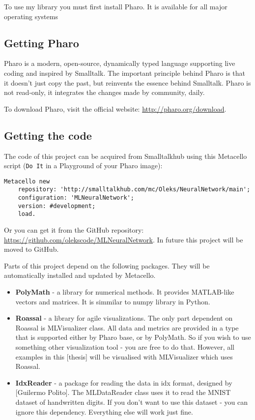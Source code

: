To use my library you must first install Pharo. It is available for all major operating systems

\subsection{Getting Pharo}
Pharo is a modern, open-source, dynamically typed language supporting live coding and inspired by Smalltalk. The important principle behind Pharo is that it doesn’t just copy the past, but reinvents the essence behind Smalltalk. Pharo is not read-only, it integrates the changes made by community, daily\cite{PBE2}.

To download Pharo, visit the official website: \url{http://pharo.org/download}.

\subsection{Getting the code}
The code of this project can be acquired from Smalltalkhub using this Metacello script (\texttt{Do It} in a Playground of your Pharo image):

\begin{lstlisting}
Metacello new 
    repository: 'http://smalltalkhub.com/mc/Oleks/NeuralNetwork/main';
    configuration: 'MLNeuralNetwork';
    version: #development;
    load.
\end{lstlisting}

Or you can get it from the GitHub repository: \url{https://github.com/olekscode/MLNeuralNetwork}. In future this project will be moved to GitHub.

Parts of this project depend on the following packages. They will be automatically installed and updated by Metacello.
\begin{itemize}
  \item \textbf{PolyMath} - a library for numerical methods. It provides MATLAB-like vectors and matrices. It is simmilar to numpy library in Python.
  \item \textbf{Roassal} - a library for agile visualizations. The only part dependent on Roassal is MLVisualizer class. All data and metrics are provided in a type that is supported either by Pharo base, or by PolyMath. So if you wish to use something other visualization tool - you are free to do that. However, all examples in this [thesis] will be visualised with MLVisualizer which uses Roassal.
  \item \textbf{IdxReader} - a package for reading the data in idx format, designed by [Guilermo Polito]. The MLDataReader class uses it to read the MNIST dataset of handwritten digits. If you don't want to use this dataset - you can ignore this dependency. Everything else will work just fine.
\end{itemize}

